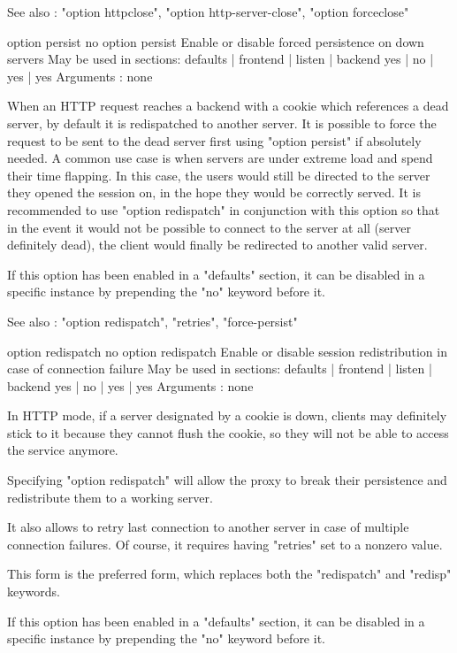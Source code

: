   See also : "option httpclose", "option http-server-close",
             "option forceclose"


option persist
no option persist
  Enable or disable forced persistence on down servers
  May be used in sections:    defaults | frontend | listen | backend
                                 yes   |    no    |   yes  |   yes
  Arguments : none

  When an HTTP request reaches a backend with a cookie which references a dead
  server, by default it is redispatched to another server. It is possible to
  force the request to be sent to the dead server first using "option persist"
  if absolutely needed. A common use case is when servers are under extreme
  load and spend their time flapping. In this case, the users would still be
  directed to the server they opened the session on, in the hope they would be
  correctly served. It is recommended to use "option redispatch" in conjunction
  with this option so that in the event it would not be possible to connect to
  the server at all (server definitely dead), the client would finally be
  redirected to another valid server.

  If this option has been enabled in a "defaults" section, it can be disabled
  in a specific instance by prepending the "no" keyword before it.

  See also : "option redispatch", "retries", "force-persist"


option redispatch
no option redispatch
  Enable or disable session redistribution in case of connection failure
  May be used in sections:    defaults | frontend | listen | backend
                                 yes   |    no    |   yes  |   yes
  Arguments : none

  In HTTP mode, if a server designated by a cookie is down, clients may
  definitely stick to it because they cannot flush the cookie, so they will not
  be able to access the service anymore.

  Specifying "option redispatch" will allow the proxy to break their
  persistence and redistribute them to a working server.

  It also allows to retry last connection to another server in case of multiple
  connection failures. Of course, it requires having "retries" set to a nonzero
  value.

  This form is the preferred form, which replaces both the "redispatch" and
  "redisp" keywords.

  If this option has been enabled in a "defaults" section, it can be disabled
  in a specific instance by prepending the "no" keyword before it.

